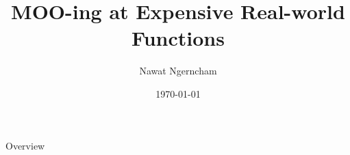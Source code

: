 \documentclass{beamer}
\title{MOO-ing at Expensive Real-world Functions}
\author{Nawat Ngerncham}
\date{\today}
\begin{document}
\begin{frame}
  \titlepage
\end{frame}

\begin{frame}{Overview}
  \tableofcontents
\end{frame}






\end{document}
